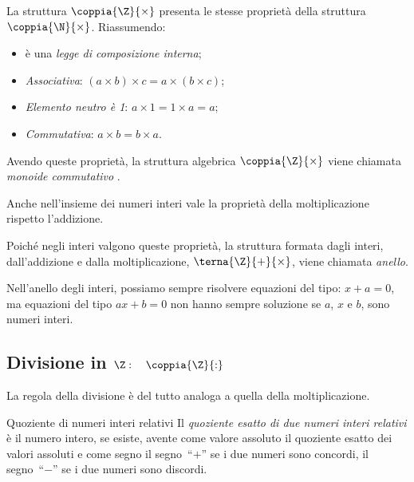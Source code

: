 La struttura  
\(\coppia{\Z}{\times}\) presenta le stesse proprietà della struttura 
\(\coppia{\N}{\times}\).
Riassumendo:
\begin{itemize} [noitemsep]
 \item è una \emph{legge di composizione interna};
 \item \emph{Associativa}: \quad 
 \((a \times b) \times c = a \times (b \times c)\);
 \item \emph{Elemento neutro è 1}: \quad 
 \(a \times 1 = 1 \times a = a\);
 \item \emph{Commutativa}: \quad 
 \(a \times b = b \times a\).
\end{itemize}
Avendo queste proprietà, la struttura algebrica \(\coppia{\Z}{\times}\) viene 
chiamata \emph{monoide commutativo}
.

Anche nell'insieme dei numeri interi vale la proprietà 
 della
moltiplicazione rispetto l'addizione.

\bigskip
Poiché negli interi valgono queste proprietà, la struttura formata dagli 
interi, dall'addizione e dalla moltiplicazione, \(\terna{\Z}{+}{\times}\),
viene chiamata \emph{anello}.

Nell'anello degli interi, possiamo sempre risolvere equazioni del tipo:
\(x + a = 0\), ma equazioni del tipo \(ax + b = 0\) non hanno sempre 
soluzione se \(a\), \(x\) e \(b\), sono numeri interi.


\subsection{Divisione in 
\texorpdfstring{$\Z: \quad \coppia{\Z}{:}$}{Z: (Z; :)}}
\indc{\(\Z\)}{\(\coppia{\Z}{:}\)}

La regola della divisione è del tutto analoga a quella della 
moltiplicazione.

\begin{definizione}{Quoziente di numeri interi relativi}{}
Il \emph{quoziente esatto di due numeri interi relativi}
 è il numero intero, 
se esiste, avente come valore assoluto il quoziente esatto dei valori 
assoluti e come segno 
il segno~``\(+\)'' se i due numeri sono concordi,
il segno~``\(-\)'' se i due numeri sono discordi.
\end{definizione}

